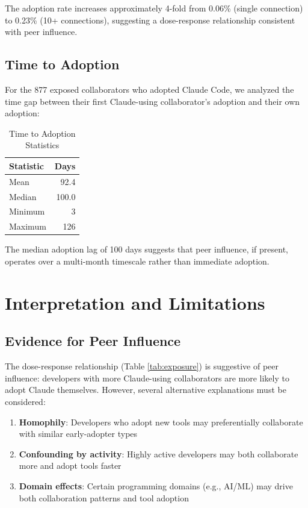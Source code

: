 \documentclass[11pt]{article}
\begin{document}
The adoption rate increases approximately 4-fold from 0.06\% (single connection) to 0.23\% (10+ connections), suggesting a dose-response relationship consistent with peer influence.

\subsection{Time to Adoption}

For the 877 exposed collaborators who adopted Claude Code, we analyzed the time gap between their first Claude-using collaborator's adoption and their own adoption:

\begin{table}[H]
\centering
\caption{Time to Adoption Statistics}
\label{tab:timing}
\begin{tabular}{lr}
\toprule
\textbf{Statistic} & \textbf{Days} \\
\midrule
Mean & 92.4 \\
Median & 100.0 \\
Minimum & 3 \\
Maximum & 126 \\
\bottomrule
\end{tabular}
\end{table}

The median adoption lag of 100 days suggests that peer influence, if present, operates over a multi-month timescale rather than immediate adoption.

\section{Interpretation and Limitations}

\subsection{Evidence for Peer Influence}

The dose-response relationship (Table \ref{tab:exposure}) is suggestive of peer influence: developers with more Claude-using collaborators are more likely to adopt Claude themselves. However, several alternative explanations must be considered:

\begin{enumerate}
    \item \textbf{Homophily}: Developers who adopt new tools may preferentially collaborate with similar early-adopter types
    \item \textbf{Confounding by activity}: Highly active developers may both collaborate more and adopt tools faster
    \item \textbf{Domain effects}: Certain programming domains (e.g., AI/ML) may drive both collaboration patterns and tool adoption
\end{enumerate}
\end{document}
